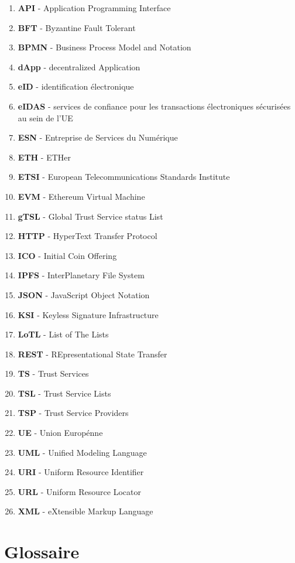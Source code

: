 \documentclass{tnreport}
\begin{document}
\begin{enumerate}
	\item \textbf{API} - Application Programming Interface
	\item \textbf{BFT} - Byzantine Fault Tolerant
	\item \textbf{BPMN} - Business Process Model and Notation
	\item \textbf{dApp} - decentralized Application
	\item \textbf{eID} - identification électronique
	\item \textbf{eIDAS} - services de confiance pour les transactions électroniques sécurisées au sein de l'UE
	\item \textbf{ESN} - Entreprise de Services du Numérique
	\item \textbf{ETH} - ETHer
	\item \textbf{ETSI} - European Telecommunications Standards Institute
	\item \textbf{EVM} - Ethereum Virtual Machine
	\item \textbf{gTSL} - Global Trust Service status List
	\item \textbf{HTTP} - HyperText Transfer Protocol 
	\item \textbf{ICO} - Initial Coin Offering
	\item \textbf{IPFS} - InterPlanetary File System
	\item \textbf{JSON} - JavaScript Object Notation
	\item \textbf{KSI} - Keyless Signature Infrastructure
	\item \textbf{LoTL} - List of The Lists
	\item \textbf{REST} - REpresentational State Transfer
	\item \textbf{TS} - Trust Services
	\item \textbf{TSL} - Trust Service Lists
	\item \textbf{TSP} - Trust Service Providers
	\item \textbf{UE} - Union Europénne
	\item \textbf{UML} - Unified Modeling Language
	\item \textbf{URI} - Uniform Resource Identifier
	\item \textbf{URL} - Uniform Resource Locator
	\item \textbf{XML} - eXtensible Markup Language
\end{enumerate}

\chapter*{Glossaire}
\end{document}
